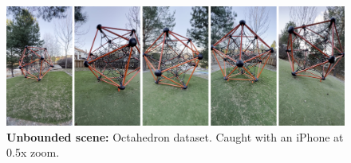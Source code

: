 \begin{figure}[!h]
    \centering
    \includegraphics[width=1.0\textwidth]{figures/octahedron-dataset.png}
    \caption{\textbf{Unbounded scene:} Octahedron dataset. Caught with an iPhone at 0.5x zoom.}
    \label{fig:octahedron-dataset}
\end{figure}
